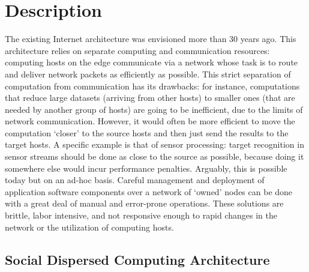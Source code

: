 \documentclass[12pt,letterpaper]{article}
\begin{document}
\clearpage
\section{Description}
The existing Internet architecture was envisioned more than 30 years ago. This architecture relies on separate computing and communication resources: computing hosts on the edge communicate via a network whose task is to route and deliver network packets as efficiently as possible. This strict separation of computation from communication has its drawbacks: for instance, computations that reduce large datasets (arriving from other hosts) to smaller ones (that are needed by another group of hosts) are going to be inefficient, due to the limits of network communication. However, it would often be more efficient to move the computation `closer' to the source hosts and then just send the results to the target hosts. A specific example is that of sensor processing: target recognition in sensor streams should be done as close to the source as possible, because doing it somewhere else would incur performance penalties.  Arguably, this is possible today but on an ad-hoc basis. Careful management and deployment of application software components over a network of `owned' nodes can be done with a great deal of manual and error-prone operations. These solutions are brittle, labor intensive, and not responsive enough to rapid changes in the network or the utilization of computing hosts. 

\subsection{Social Dispersed Computing Architecture}
\end{document}
